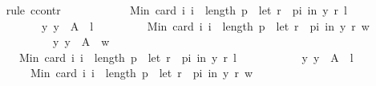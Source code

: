 \begin{isabellebody}
\ \ \isamarkupfalse%
\ {\isacharparenleft}{\kern0pt}rule\ ccontr{\isacharparenright}{\kern0pt}\isanewline
\ \ \ \ \isamarkupfalse%
\isanewline
\ \ \ \ \ \ {\isachardoublequoteopen}{\isasymnot}\ Min\ {\isacharbraceleft}{\kern0pt}card\ {\isacharbraceleft}{\kern0pt}i{\isachardot}{\kern0pt}\ i\ {\isacharless}{\kern0pt}\ length\ p\ {\isasymand}\ {\isacharparenleft}{\kern0pt}let\ r\ {\isacharequal}{\kern0pt}\ {\isacharparenleft}{\kern0pt}p{\isacharbang}{\kern0pt}i{\isacharparenright}{\kern0pt}\ in\ {\isacharparenleft}{\kern0pt}y\ {\isasympreceq}\isactrlsub r\ l{\isacharparenright}{\kern0pt}{\isacharparenright}{\kern0pt}{\isacharbraceright}{\kern0pt}\ {\isacharbar}{\kern0pt}\isanewline
\ \ \ \ \ \ \ \ \ \ y{\isachardot}{\kern0pt}\ y\ {\isasymin}\ A\ {\isacharminus}{\kern0pt}\ {\isacharbraceleft}{\kern0pt}l{\isacharbraceright}{\kern0pt}{\isacharbraceright}{\kern0pt}\ {\isacharless}{\kern0pt}\isanewline
\ \ \ \ \ \ \ \ Min\ {\isacharbraceleft}{\kern0pt}card\ {\isacharbraceleft}{\kern0pt}i{\isachardot}{\kern0pt}\ i\ {\isacharless}{\kern0pt}\ length\ p\ {\isasymand}\ {\isacharparenleft}{\kern0pt}let\ r\ {\isacharequal}{\kern0pt}\ {\isacharparenleft}{\kern0pt}p{\isacharbang}{\kern0pt}i{\isacharparenright}{\kern0pt}\ in\ {\isacharparenleft}{\kern0pt}y\ {\isasympreceq}\isactrlsub r\ w{\isacharparenright}{\kern0pt}{\isacharparenright}{\kern0pt}{\isacharbraceright}{\kern0pt}\ {\isacharbar}{\kern0pt}\isanewline
\ \ \ \ \ \ \ \ \ \ \ \ y{\isachardot}{\kern0pt}\ y\ {\isasymin}\ A\ {\isacharminus}{\kern0pt}\ {\isacharbraceleft}{\kern0pt}w{\isacharbraceright}{\kern0pt}{\isacharbraceright}{\kern0pt}{\isachardoublequoteclose}\isanewline
\ \ \ \ \isamarkupfalse%
\isanewline
\ \ \ \ \ \ {\isachardoublequoteopen}Min\ {\isacharbraceleft}{\kern0pt}card\ {\isacharbraceleft}{\kern0pt}i{\isachardot}{\kern0pt}\ i\ {\isacharless}{\kern0pt}\ length\ p\ {\isasymand}\ {\isacharparenleft}{\kern0pt}let\ r\ {\isacharequal}{\kern0pt}\ {\isacharparenleft}{\kern0pt}p{\isacharbang}{\kern0pt}i{\isacharparenright}{\kern0pt}\ in\ {\isacharparenleft}{\kern0pt}y\ {\isasympreceq}\isactrlsub r\ l{\isacharparenright}{\kern0pt}{\isacharparenright}{\kern0pt}{\isacharbraceright}{\kern0pt}\ {\isacharbar}{\kern0pt}\isanewline
\ \ \ \ \ \ \ \ \ \ y{\isachardot}{\kern0pt}\ y\ {\isasymin}\ A\ {\isacharminus}{\kern0pt}\ {\isacharbraceleft}{\kern0pt}l{\isacharbraceright}{\kern0pt}{\isacharbraceright}{\kern0pt}\ {\isasymge}\isanewline
\ \ \ \ \ \ \ \ Min\ {\isacharbraceleft}{\kern0pt}card\ {\isacharbraceleft}{\kern0pt}i{\isachardot}{\kern0pt}\ i\ {\isacharless}{\kern0pt}\ length\ p\ {\isasymand}\ {\isacharparenleft}{\kern0pt}let\ r\ {\isacharequal}{\kern0pt}\ {\isacharparenleft}{\kern0pt}p{\isacharbang}{\kern0pt}i{\isacharparenright}{\kern0pt}\ in\ {\isacharparenleft}{\kern0pt}y\ {\isasympreceq}\isactrlsub r\ w{\isacharparenright}{\kern0pt}{\isacharparenright}{\kern0pt}{\isacharbraceright}{\kern0pt}\ {\isacharbar}{\kern0pt}\isanewline

\end{isabellebody}
